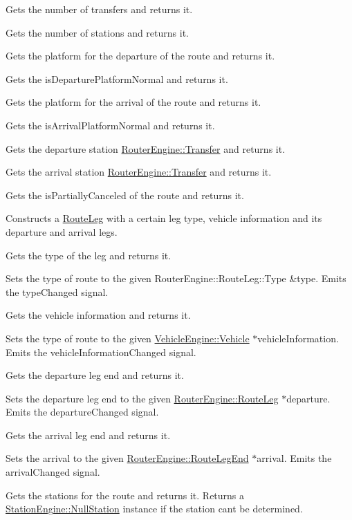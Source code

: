 Gets the number of transfers and returns it.

Gets the number of stations and returns it.

Gets the platform for the departure of the route and returns it.

Gets the is\+Departure\+Platform\+Normal and returns it.

Gets the platform for the arrival of the route and returns it.

Gets the is\+Arrival\+Platform\+Normal and returns it.

Gets the departure station \mbox{\hyperlink{classRouterEngine_1_1Transfer}{Router\+Engine\+::\+Transfer}} and returns it.

Gets the arrival station \mbox{\hyperlink{classRouterEngine_1_1Transfer}{Router\+Engine\+::\+Transfer}} and returns it.

Gets the is\+Partially\+Canceled of the route and returns it.

Constructs a \mbox{\hyperlink{classRouterEngine_1_1RouteLeg}{Route\+Leg}} with a certain leg type, vehicle information and it\textquotesingle{}s departure and arrival legs.

Gets the type of the leg and returns it.

Sets the type of route to the given Router\+Engine\+::\+Route\+Leg\+::\+Type \&type. Emits the type\+Changed signal.

Gets the vehicle information and returns it.

Sets the type of route to the given \mbox{\hyperlink{classVehicleEngine_1_1Vehicle}{Vehicle\+Engine\+::\+Vehicle}} $\ast$vehicle\+Information. Emits the vehicle\+Information\+Changed signal.

Gets the departure leg end and returns it.

Sets the departure leg end to the given \mbox{\hyperlink{classRouterEngine_1_1RouteLeg}{Router\+Engine\+::\+Route\+Leg}} $\ast$departure. Emits the departure\+Changed signal.

Gets the arrival leg end and returns it.

Sets the arrival to the given \mbox{\hyperlink{classRouterEngine_1_1RouteLegEnd}{Router\+Engine\+::\+Route\+Leg\+End}} $\ast$arrival. Emits the arrival\+Changed signal.

Gets the stations for the route and returns it. Returns a \mbox{\hyperlink{classStationEngine_1_1NullStation}{Station\+Engine\+::\+Null\+Station}} instance if the station can\textquotesingle{}t be determined.

